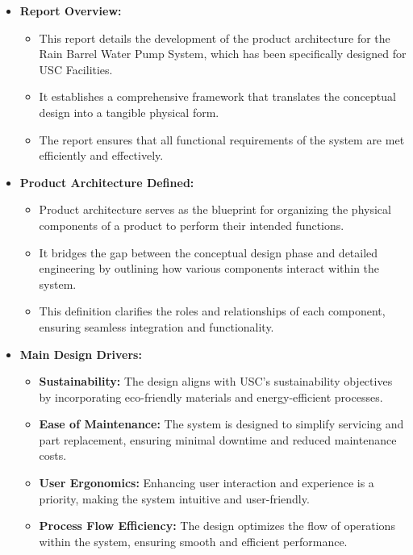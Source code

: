 \documentclass[12pt]{article}
\begin{document}
\begin{itemize}
    \item \textbf{Report Overview:}
    \begin{itemize}
        \item This report details the development of the product architecture for the Rain Barrel Water Pump System, which has been specifically designed for USC Facilities.
        \item It establishes a comprehensive framework that translates the conceptual design into a tangible physical form.
        \item The report ensures that all functional requirements of the system are met efficiently and effectively.
    \end{itemize}
    
    \item \textbf{Product Architecture Defined:}
    \begin{itemize}
        \item Product architecture serves as the blueprint for organizing the physical components of a product to perform their intended functions.
        \item It bridges the gap between the conceptual design phase and detailed engineering by outlining how various components interact within the system.
        \item This definition clarifies the roles and relationships of each component, ensuring seamless integration and functionality.
    \end{itemize}
    
    \item \textbf{Main Design Drivers:}
    \begin{itemize}
        \item \textbf{Sustainability:} The design aligns with USC's sustainability objectives by incorporating eco-friendly materials and energy-efficient processes.
        \item \textbf{Ease of Maintenance:} The system is designed to simplify servicing and part replacement, ensuring minimal downtime and reduced maintenance costs.
        \item \textbf{User Ergonomics:} Enhancing user interaction and experience is a priority, making the system intuitive and user-friendly.
        \item \textbf{Process Flow Efficiency:} The design optimizes the flow of operations within the system, ensuring smooth and efficient performance.
    \end{itemize}
    

\end{itemize}
\end{document}
